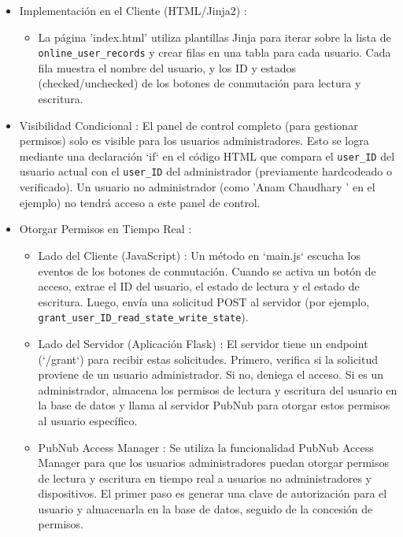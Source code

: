 \documentclass{report}
\begin{document}
\begin{itemize}
\begin{itemize}
        \item Implementación en el Cliente (HTML/Jinja2) :
        \begin{itemize}
            \item La página 'index.html' utiliza plantillas Jinja para iterar sobre la lista de \verb|online_user_records| y crear filas en una 
            tabla para cada usuario. Cada fila muestra el nombre del usuario, y los ID y estados (checked/unchecked) de los botones de conmutación 
            para lectura y escritura.
        \end{itemize}
        \item Visibilidad Condicional : El panel de control completo (para gestionar permisos)  solo es visible para los usuarios administradores. 
        Esto se logra mediante una declaración `if` en el código HTML que compara el \verb|user_ID| del usuario actual con el \verb|user_ID| 
        del administrador (previamente hardcodeado o verificado). Un usuario no administrador (como  'Anam Chaudhary ' en el ejemplo) no tendrá 
        acceso a este panel de control.
        
        \item Otorgar Permisos en Tiempo Real : 
        \begin{itemize}
            \item Lado del Cliente (JavaScript) : Un método en `main.js` escucha los eventos de los botones de conmutación. Cuando se activa un 
            botón de acceso, extrae el ID del usuario, el estado de lectura y el estado de escritura. Luego, envía una solicitud POST al servidor 
            (por ejemplo, \verb|grant_user_ID_read_state_write_state|).
            \item Lado del Servidor (Aplicación Flask) : El servidor tiene un endpoint (`/grant`) para recibir estas solicitudes. Primero, verifica 
            si la solicitud proviene de un usuario administrador. Si no, deniega el acceso. Si es un administrador, almacena los permisos de lectura 
            y escritura del usuario en la base de datos y llama al servidor PubNub para otorgar estos permisos al usuario específico.
            \item PubNub Access Manager : Se utiliza la funcionalidad  PubNub Access Manager  para que los usuarios administradores puedan otorgar 
            permisos de lectura y escritura en tiempo real a usuarios no administradores y dispositivos. El primer paso es generar una clave de 
            autorización para el usuario y almacenarla en la base de datos, seguido de la concesión de permisos.
        \end{itemize}
    \end{itemize}
\end{itemize}
\end{document}
